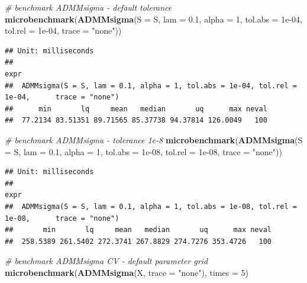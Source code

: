 \documentclass[11pt,]{book}
\newenvironment{Shaded}{\begin{snugshade}}{\end{snugshade}}
\newcommand{\CommentTok}[1]{\textcolor[rgb]{0.56,0.35,0.01}{\textit{#1}}}
\newcommand{\DataTypeTok}[1]{\textcolor[rgb]{0.13,0.29,0.53}{#1}}
\newcommand{\DecValTok}[1]{\textcolor[rgb]{0.00,0.00,0.81}{#1}}
\newcommand{\FloatTok}[1]{\textcolor[rgb]{0.00,0.00,0.81}{#1}}
\newcommand{\KeywordTok}[1]{\textcolor[rgb]{0.13,0.29,0.53}{\textbf{#1}}}
\newcommand{\NormalTok}[1]{#1}
\newcommand{\StringTok}[1]{\textcolor[rgb]{0.31,0.60,0.02}{#1}}
\theoremstyle{definition}
\theoremstyle{definition}
\theoremstyle{definition}
\theoremstyle{remark}
\begin{document}
\begin{Shaded}
\begin{Highlighting}[]
\CommentTok{# benchmark ADMMsigma - default tolerance}
\KeywordTok{microbenchmark}\NormalTok{(}\KeywordTok{ADMMsigma}\NormalTok{(}\DataTypeTok{S =}\NormalTok{ S, }\DataTypeTok{lam =} \FloatTok{0.1}\NormalTok{, }\DataTypeTok{alpha =} \DecValTok{1}\NormalTok{, }\DataTypeTok{tol.abs =} \FloatTok{1e-04}\NormalTok{, }\DataTypeTok{tol.rel =} \FloatTok{1e-04}\NormalTok{, }
    \DataTypeTok{trace =} \StringTok{"none"}\NormalTok{))}
\end{Highlighting}
\end{Shaded}

\begin{verbatim}
## Unit: milliseconds
##                                                                                           expr
##  ADMMsigma(S = S, lam = 0.1, alpha = 1, tol.abs = 1e-04, tol.rel = 1e-04,      trace = "none")
##      min       lq     mean   median       uq      max neval
##  77.2134 83.51351 89.71565 85.37738 94.37814 126.0049   100
\end{verbatim}

\begin{Shaded}
\begin{Highlighting}[]
\CommentTok{# benchmark ADMMsigma - tolerance 1e-8}
\KeywordTok{microbenchmark}\NormalTok{(}\KeywordTok{ADMMsigma}\NormalTok{(}\DataTypeTok{S =}\NormalTok{ S, }\DataTypeTok{lam =} \FloatTok{0.1}\NormalTok{, }\DataTypeTok{alpha =} \DecValTok{1}\NormalTok{, }\DataTypeTok{tol.abs =} \FloatTok{1e-08}\NormalTok{, }\DataTypeTok{tol.rel =} \FloatTok{1e-08}\NormalTok{, }
    \DataTypeTok{trace =} \StringTok{"none"}\NormalTok{))}
\end{Highlighting}
\end{Shaded}

\begin{verbatim}
## Unit: milliseconds
##                                                                                           expr
##  ADMMsigma(S = S, lam = 0.1, alpha = 1, tol.abs = 1e-08, tol.rel = 1e-08,      trace = "none")
##       min       lq     mean   median       uq      max neval
##  258.5389 261.5402 272.3741 267.8829 274.7276 353.4726   100
\end{verbatim}

\begin{Shaded}
\begin{Highlighting}[]
\CommentTok{# benchmark ADMMsigma CV - default parameter grid}
\KeywordTok{microbenchmark}\NormalTok{(}\KeywordTok{ADMMsigma}\NormalTok{(X, }\DataTypeTok{trace =} \StringTok{"none"}\NormalTok{), }\DataTypeTok{times =} \DecValTok{5}\NormalTok{)}
\end{Highlighting}
\end{Shaded}
\end{document}
